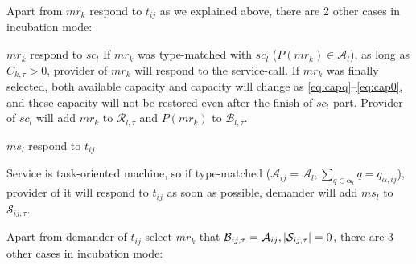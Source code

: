 Apart from $mr_k$ respond to $t_{ij}$ as we explained above, there are 2 other cases in incubation mode:
\begin{asparaenum}
\item $mr_k$ respond to $sc_l$
If $mr_k$ was type-matched with $sc_l$ ($P(mr_k)\in\mathcal{A}_l$), as long as $C_{k,\tau}> 0$, provider of $mr_k$ will respond to the service-call. If $mr_k$ was finally selected, both available capacity and capacity will change as \autoref{eq:capq}--\ref{eq:cap0}, and these capacity will not be restored even after the finish of $sc_l$ part. Provider of $sc_l$ will add $mr_k$ to $\mathcal{R}_{l,\tau}$ and $P(mr_k)$ to $\mathcal{B}_{l,\tau}$.
\item $ms_l$ respond to $t_{ij}$
\end{asparaenum}
Service is task-oriented machine, so if type-matched ($\mathcal{A}_{ij} =\mathcal{A}_l,\sum_{q\in\bm{\alpha}_l} q = q_{\alpha,ij}$), provider of it will respond to $t_{ij}$ as soon as possible, demander will add $ms_l$ to $\mathcal{S}_{ij,\tau}$.


Apart from demander of $t_{ij}$ select $mr_k$ that $\mathcal{B}_{ij,\tau} = \mathcal{A}_{ij},\left|\mathcal{S}_{ij,\tau}\right|=0$, there are 3 other cases in incubation mode:

